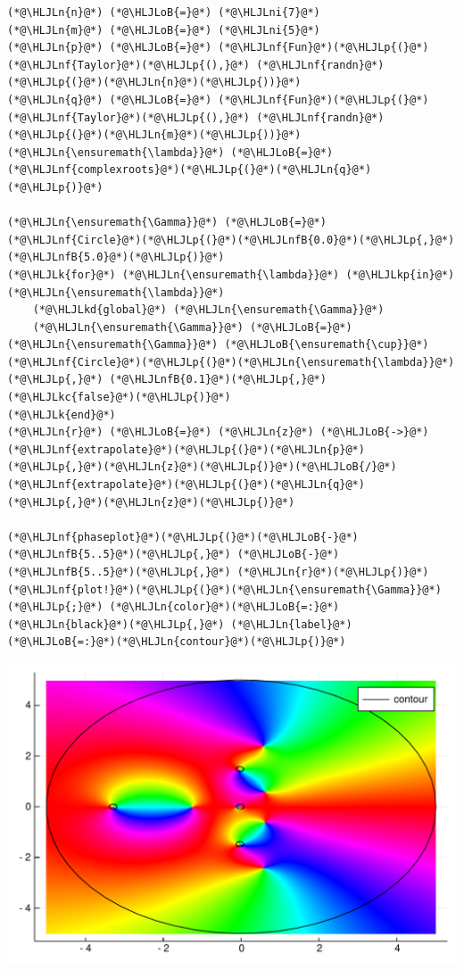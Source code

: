 \documentclass[12pt,a4paper]{article}
\newcommand{\HLJLk}[1]{\textcolor[RGB]{148,91,176}{\textbf{#1}}}
\newcommand{\HLJLkc}[1]{\textcolor[RGB]{59,151,46}{\textit{#1}}}
\newcommand{\HLJLkd}[1]{\textcolor[RGB]{214,102,97}{\textit{#1}}}
\newcommand{\HLJLkp}[1]{\textcolor[RGB]{148,91,176}{\textbf{#1}}}
\newcommand{\HLJLn}[1]{#1}
\newcommand{\HLJLnf}[1]{\textcolor[RGB]{66,102,213}{#1}}
\newcommand{\HLJLnfB}[1]{\textcolor[RGB]{59,151,46}{#1}}
\newcommand{\HLJLni}[1]{\textcolor[RGB]{59,151,46}{#1}}
\newcommand{\HLJLoB}[1]{\textcolor[RGB]{102,102,102}{\textbf{#1}}}
\newcommand{\HLJLp}[1]{#1}
\begin{document}
\begin{lstlisting}
(*@\HLJLn{n}@*) (*@\HLJLoB{=}@*) (*@\HLJLni{7}@*)
(*@\HLJLn{m}@*) (*@\HLJLoB{=}@*) (*@\HLJLni{5}@*)
(*@\HLJLn{p}@*) (*@\HLJLoB{=}@*) (*@\HLJLnf{Fun}@*)(*@\HLJLp{(}@*)(*@\HLJLnf{Taylor}@*)(*@\HLJLp{(),}@*) (*@\HLJLnf{randn}@*)(*@\HLJLp{(}@*)(*@\HLJLn{n}@*)(*@\HLJLp{))}@*)
(*@\HLJLn{q}@*) (*@\HLJLoB{=}@*) (*@\HLJLnf{Fun}@*)(*@\HLJLp{(}@*)(*@\HLJLnf{Taylor}@*)(*@\HLJLp{(),}@*) (*@\HLJLnf{randn}@*)(*@\HLJLp{(}@*)(*@\HLJLn{m}@*)(*@\HLJLp{))}@*)
(*@\HLJLn{\ensuremath{\lambda}}@*) (*@\HLJLoB{=}@*) (*@\HLJLnf{complexroots}@*)(*@\HLJLp{(}@*)(*@\HLJLn{q}@*)(*@\HLJLp{)}@*)

(*@\HLJLn{\ensuremath{\Gamma}}@*) (*@\HLJLoB{=}@*) (*@\HLJLnf{Circle}@*)(*@\HLJLp{(}@*)(*@\HLJLnfB{0.0}@*)(*@\HLJLp{,}@*) (*@\HLJLnfB{5.0}@*)(*@\HLJLp{)}@*)
(*@\HLJLk{for}@*) (*@\HLJLn{\ensuremath{\lambda}}@*) (*@\HLJLkp{in}@*) (*@\HLJLn{\ensuremath{\lambda}}@*)
    (*@\HLJLkd{global}@*) (*@\HLJLn{\ensuremath{\Gamma}}@*)
    (*@\HLJLn{\ensuremath{\Gamma}}@*) (*@\HLJLoB{=}@*) (*@\HLJLn{\ensuremath{\Gamma}}@*) (*@\HLJLoB{\ensuremath{\cup}}@*) (*@\HLJLnf{Circle}@*)(*@\HLJLp{(}@*)(*@\HLJLn{\ensuremath{\lambda}}@*)(*@\HLJLp{,}@*) (*@\HLJLnfB{0.1}@*)(*@\HLJLp{,}@*) (*@\HLJLkc{false}@*)(*@\HLJLp{)}@*)
(*@\HLJLk{end}@*)
(*@\HLJLn{r}@*) (*@\HLJLoB{=}@*) (*@\HLJLn{z}@*) (*@\HLJLoB{->}@*) (*@\HLJLnf{extrapolate}@*)(*@\HLJLp{(}@*)(*@\HLJLn{p}@*)(*@\HLJLp{,}@*)(*@\HLJLn{z}@*)(*@\HLJLp{)}@*)(*@\HLJLoB{/}@*)(*@\HLJLnf{extrapolate}@*)(*@\HLJLp{(}@*)(*@\HLJLn{q}@*)(*@\HLJLp{,}@*)(*@\HLJLn{z}@*)(*@\HLJLp{)}@*)

(*@\HLJLnf{phaseplot}@*)(*@\HLJLp{(}@*)(*@\HLJLoB{-}@*)(*@\HLJLnfB{5..5}@*)(*@\HLJLp{,}@*) (*@\HLJLoB{-}@*)(*@\HLJLnfB{5..5}@*)(*@\HLJLp{,}@*) (*@\HLJLn{r}@*)(*@\HLJLp{)}@*)
(*@\HLJLnf{plot!}@*)(*@\HLJLp{(}@*)(*@\HLJLn{\ensuremath{\Gamma}}@*)(*@\HLJLp{;}@*) (*@\HLJLn{color}@*)(*@\HLJLoB{=:}@*)(*@\HLJLn{black}@*)(*@\HLJLp{,}@*) (*@\HLJLn{label}@*)(*@\HLJLoB{=:}@*)(*@\HLJLn{contour}@*)(*@\HLJLp{)}@*)
\end{lstlisting}

\includegraphics[width=\linewidth]{figures/Lecture11_3_1.pdf}
\end{document}
